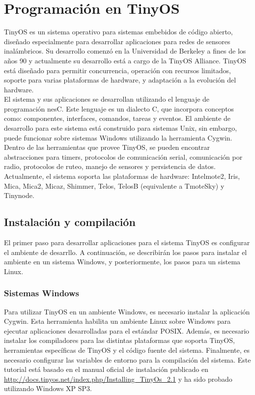 
\chapter{Programación en TinyOS}
TinyOS es un sistema operativo para sistemas embebidos de código abierto, diseñado especialmente para desarrollar aplicaciones para redes de sensores inalámbricos. Su desarrollo comenzó en la Universidad de Berkeley a fines de los años 90 y actualmente su desarrollo está a cargo de la TinyOS Alliance. TinyOS está diseñado para permitir concurrencia, operación con recursos limitados, soporte para varias plataformas de hardware, y adaptación a la evolución del hardware.\\

El sistema y sus aplicaciones se desarrollan utilizando el lenguaje de programación nesC. Este lenguaje es un dialecto C, que incorpora conceptos como: componentes, interfaces, comandos, tareas y eventos. El ambiente de desarrollo para este sistema está construido para sistemas Unix, sin embargo, puede funcionar sobre sistemas Windows utilizando la herramienta Cygwin. Dentro de las herramientas que provee TinyOS, se pueden encontrar abstracciones para timers, protocolos de comunicación serial, comunicación por radio, protocolos de ruteo, manejo de sensores y persistencia de datos. Actualmente, el sistema soporta las plataformas de hardware: Intelmote2, Iris, Mica, Mica2, Micaz, Shimmer, Telos, TelosB (equivalente a TmoteSky) y Tinynode. 

\section{Instalación y compilación}
El primer paso para desarrollar aplicaciones para el sistema TinyOS es configurar el ambiente de desarrllo. A continuación, se describirán los pasos para instalar el ambiente en un sistema Windows, y posteriormente, los pasos para un sistema Linux.

\subsection{Sistemas Windows}
Para utilizar TinyOS en un ambiente Windows, es necesario instalar la aplicación Cygwin. Esta herramienta habilita un ambiente Linux sobre Windows para ejecutar aplicaciones desarrolladas para el estándar POSIX. Además, es necesario instalar los compiladores para las distintas plataformas que soporta TinyOS, herramientas específicas de TinyOS y el código fuente del sistema. Finalmente, es necesario configurar las variables de entorno para la compilación del sistema. Este tutorial está basado en el manual oficial de instalación publicado en \url{http://docs.tinyos.net/index.php/Installing_TinyOs_2.1} y ha sido probado utilizando Windows XP SP3. 

